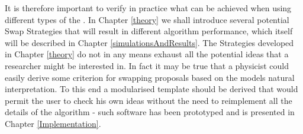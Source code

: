 It is therefore important to verify in practice what can be achieved when using different types of the \PT. In Chapter \ref{theory} we shall introduce several potential Swap Strategies that will result in different algorithm performance, which itself will be described in Chapter \ref{simulationsAndResults}. The Strategies developed in Chapter \ref{theory} do not in any means exhaust all the potential ideas that a researcher might be interested in. In fact it may be true that a physicist could easily derive some criterion for swapping proposals based on the models natural interpretation. To this end a modularised template should be derived that would permit the user to check his own ideas without the need to reimplement all the details of the algorithm - such software has been prototyped and is presented in Chapter \ref{Implementation}.